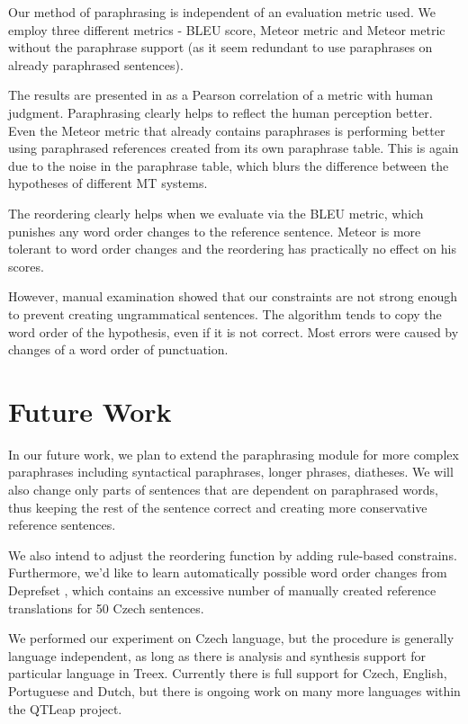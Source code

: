 Our method of paraphrasing is independent of an evaluation metric used. We 
employ three different metrics - BLEU score, Meteor metric and Meteor metric 
without the paraphrase support (as it seem redundant to use paraphrases on 
already paraphrased sentences). 

The results are presented in  as a Pearson correlation of a 
metric with human judgment. Paraphrasing clearly helps to reflect the human 
perception better. Even the Meteor metric that already contains paraphrases
is performing better using paraphrased references created from its own 
paraphrase table. This is again due to the noise in the paraphrase table, which
blurs the difference between the hypotheses of different MT systems.

The reordering clearly helps when we evaluate via the BLEU metric, which 
punishes any word order changes to the reference sentence. Meteor is more
tolerant to word order changes and the reordering has practically no effect 
on his scores.

However, manual examination showed that our constraints are not strong enough 
to prevent creating ungrammatical sentences. The algorithm tends to copy the
word order of the hypothesis, even if it is not correct. Most errors were caused
by changes of a word order of punctuation. 


\section{Future Work}
In our future work, we plan to extend the paraphrasing module for more 
complex paraphrases including %
syntactical paraphrases, longer phrases,
diatheses. We will also change only parts of sentences that are 
dependent on paraphrased words, thus keeping the rest of the sentence 
correct and creating more conservative reference sentences.

We also intend to adjust the reordering function by adding rule-based constrains. 
Furthermore, we'd like to learn automatically possible
word order changes from Deprefset \cite{bojar-scratching}, which contains 
an excessive number of manually created reference translations for 50 
Czech sentences.

We performed our experiment on Czech language, but the procedure is generally 
language independent, as long as there is analysis and synthesis support for 
particular language in Treex. Currently there is full support for Czech, 
English, Portuguese and Dutch, but there is ongoing work on many more languages 
within the QTLeap project.



